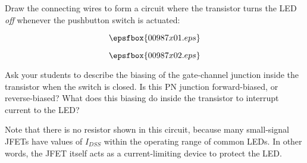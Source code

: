 

Draw the connecting wires to form a circuit where the transistor turns the LED {\it off} whenever the pushbutton switch is actuated:

$$\epsfbox{00987x01.eps}$$







$$\epsfbox{00987x02.eps}$$







Ask your students to describe the biasing of the gate-channel junction inside the transistor when the switch is closed.  Is this PN junction forward-biased, or reverse-biased?  What does this biasing do inside the transistor to interrupt current to the LED?

Note that there is no resistor shown in this circuit, because many small-signal JFETs have values of $I_{DSS}$ within the operating range of common LEDs.  In other words, the JFET itself acts as a current-limiting device to protect the LED.




